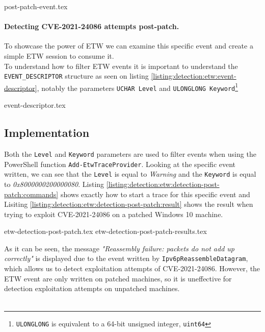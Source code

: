 \documentclass{report}
\begin{document}
{post-patch-event.tex}

\paragraph{Detecting CVE-2021-24086 attempts post-patch.}
To showcase the power of \gls{ETW} we can examine this specific event and create a simple \gls{ETW} session to consume it.
\\
To understand how to filter \gls{ETW} events it is important to understand the \texttt{EVENT_DESCRIPTOR} structure as seen on listing \ref{listing:detection:etw:event-descriptor}, notably the parameters \texttt{UCHAR Level} and \texttt{ULONGLONG Keyword}\footnote{\texttt{ULONGLONG} is equivalent to a 64-bit unsigned integer, \texttt{uint64}}

{event-descriptor.tex}

\subsection{Implementation}
Both the \texttt{Level} and \texttt{Keyword} parameters are used to filter events when using the PowerShell function \texttt{Add-EtwTraceProvider}. Looking at the specific event written, we can see that the \texttt{Level} is equal to \emph{Warning}\cite{url:etw:etw-event-descriptor} and the \texttt{Keyword} is equal to \emph{0x8000000200000080}. Listing \ref{listing:detection:etw:detection-post-patch:commands} shows exactly how to start a trace for this specific event and Lisiting \ref{listing:detection:etw:detection-post-patch:result} shows the result when trying to exploit CVE-2021-24086 on a patched Windows 10 machine.

{etw-detection-post-patch.tex}
{etw-detection-post-patch-results.tex}

As it can be seen, the message \emph{"Reassembly failure: packets do not add up correctly"} is displayed due to the event written by \texttt{Ipv6pReassembleDatagram}, which allows us to detect exploitation attempts of CVE-2021-24086. However, the \gls{ETW} event are only written on patched machines, so it is uneffective for detection exploitation attempts on unpatched machines.
\\
\\
\end{document}
